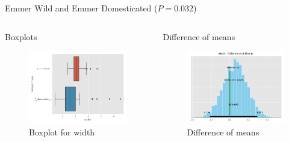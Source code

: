 \documentclass[t, aspectratio=169]{beamer}
\begin{document}
\begin{frame}[label={sec:org7c5fc2c}]{Emmer Wild and Emmer Domesticated (\(P = 0.032\))}
\begin{columns}
\begin{column}{0.5\columnwidth}
\begin{block}{Boxplots}
\begin{figure}[htbp]
\centering
\includegraphics[width=4.5cm]{./images/dicbox.png}
\caption{\label{fig:orgdacaa5b}
Boxplot for width}
\end{figure}
\end{block}
\end{column}

\begin{column}{0.5\columnwidth}
\begin{block}{Difference of means}
\begin{figure}[htbp]
\centering
\includegraphics[width=4.5cm]{./images/dicdiff.png}
\caption{\label{fig:org9a7ed8e}
Difference of means}
\end{figure}
\end{block}
\end{column}
\end{columns}
\end{frame}
\end{document}
